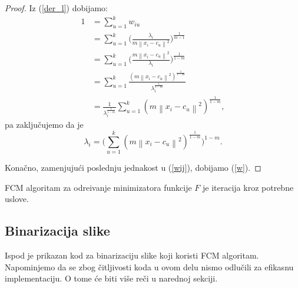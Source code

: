 \documentclass[12pt,a4paper]{article}
\theoremstyle{definition}
\theoremstyle{remark}
\theoremstyle{plain}
\begin{document}
\begin{proof}
Iz (\ref{der_l}) dobijamo:
\begin{align*}
  1&=\sum_{u=1}^{k}w_{iu}\\
   &=\sum_{u=1}^{k}\biggl(\frac{\lambda_{i}}{m\left\|x_{i}-c_{u}\right\|^{2}}\biggr)^{\frac{1}{m-1}}\\
   &=\sum_{u=1}^{k}\biggl(\frac{m\left\|x_{i}-c_{u}\right\|^{2}}{\lambda_{i}}\biggr)^{\frac{1}{1-m}}\\
   &=\sum_{u=1}^{k}\frac{(m\left\|x_{i}-c_{u}\right\|^{2})^{\frac{1}{1-m}}}{\lambda_{i}^{\frac{1}{1-m}}}\\
   &=\frac{1}{\lambda_{i}^{\frac{1}{1-m}}}\sum_{u=1}^{k}(m\left\|x_{i}-c_{u}\right\|^{2})^{\frac{1}{1-m}},
\end{align*}
pa zaklju\v cujemo da je
\begin{equation*}
  \lambda_{i} = \biggl(\sum_{u=1}^{k}(m\left\|x_{i}-c_{u}\right\|^{2})^{\frac{1}{1-m}}\biggr)^{1-m}.
\end{equation*}

Kona\v cno, zamenjuju\' ci poslednju jednakost u (\ref{wij}), dobijamo (\ref{w}). 
\end{proof}

FCM algoritam za odre\dj ivanje minimizatora funkcije $F$ je iteracija kroz potrebne uslove.

\subsection{Binarizacija slike}
Ispod je prikazan kod za binarizaciju slike koji koristi FCM algoritam. Napominjemo da se zbog \v citljivosti koda u ovom delu nismo odlu\v cili za efikasnu implementaciju. O tome \' ce biti vi\v se re\v ci u narednoj sekciji.

\inputminted[tabsize=2,breaklines]{cpp}{codes/binarization.cpp}
\end{document}
